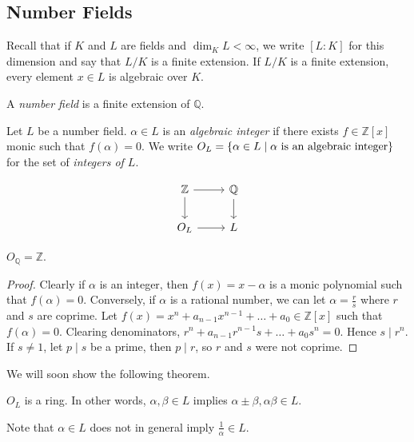 \subsection{Number Fields}
Recall that if \( K \) and \( L \) are fields and \( \dim_K L < \infty \), we write \( [L : K] \) for this dimension and say that \( L / K \) is a finite extension.
If \( L / K \) is a finite extension, every element \( x \in L \) is algebraic over \( K \).
\begin{definition}
    A \emph{number field} is a finite extension of \( \mathbb Q \).
\end{definition}
\begin{definition}
    Let \( L \) be a number field.
    \( \alpha \in L \) is an \emph{algebraic integer} if there exists \( f \in \mathbb Z[x] \) monic such that \( f(\alpha) = 0 \).
    We write \( O_L = \qty{\alpha \in L \mid \alpha \text{ is an algebraic integer}} \) for the set of \emph{integers of \( L \)}.
\end{definition}
\[\begin{tikzcd}
	{\mathbb Z} & {\mathbb Q} \\
	{O_L} & L
	\arrow[from=1-1, to=1-2]
	\arrow[from=1-2, to=2-2]
	\arrow[from=1-1, to=2-1]
	\arrow[from=2-1, to=2-2]
\end{tikzcd}\]
\begin{lemma}
    \( O_{\mathbb Q} = \mathbb Z \).
\end{lemma}
\begin{proof}
    Clearly if \( \alpha \) is an integer, then \( f(x) = x - \alpha \) is a monic polynomial such that \( f(\alpha) = 0 \).
    Conversely, if \( \alpha \) is a rational number, we can let \( \alpha = \frac{r}{s} \) where \( r \) and \( s \) are coprime.
    Let \( f(x) = x^n + a_{n-1} x^{n-1} + \dots + a_0 \in \mathbb Z[x] \) such that \( f(\alpha) = 0 \).
    Clearing denominators, \( r^n + a_{n-1} r^{n-1} s + \dots + a_0 s^n = 0 \).
    Hence \( s \mid r^n \).
    If \( s \neq 1 \), let \( p \mid s \) be a prime, then \( p \mid r \), so \( r \) and \( s \) were not coprime.
\end{proof}
We will soon show the following theorem.
\begin{theorem}
    \( O_L \) is a ring.
    In other words, \( \alpha, \beta \in L \) implies \( \alpha \pm \beta, \alpha \beta \in L \).
\end{theorem}
Note that \( \alpha \in L \) does not in general imply \( \frac{1}{\alpha} \in L \).
